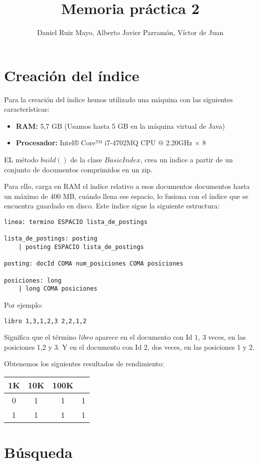 \documentclass[palatino,nochap]{apuntes}
\title{Memoria práctica 2}
\author{Daniel Ruiz Mayo, Alberto Javier Parramón, Víctor de Juan}
\date{}
\begin{document}
\pagestyle{plain}
\maketitle




\section{Creación del índice}

Para la creación del índice hemos utilizado una máquina con las siguientes características:

\begin{itemize}
	\item \textbf{RAM: }5,7 GB (Usamos hasta 5 GB en la máquina virtual de Java)
	\item \textbf{Procesador: } Intel® Core™ i7-4702MQ CPU @ 2.20GHz × 8 
\end{itemize}

EL método $build()$ de la clase $BasicIndex$, crea un índice a partir de un conjunto de documentos comprimidos en un zip.

Para ello, carga en RAM el índice relativo a esos documentos documentos hasta un máximo de 400 MB, cuándo llena ese espacio, lo fusiona con el índice que se encuentra guardado en disco. Este índice sigue la siguiente estructura:

\begin{verbatim}
linea: termino ESPACIO lista_de_postings

lista_de_postings: posting
	| posting ESPACIO lista_de_postings

posting: docId COMA num_posiciones COMA posiciones

posiciones: long
	| long COMA posiciones

\end{verbatim}

Por ejemplo:

\begin{verbatim}
libro 1,3,1,2,3 2,2,1,2
\end{verbatim}

Significa que el término $libro$ aparece en el documento con Id $1$, 3 veces, en las posiciones 1,2 y 3. Y en el documento con Id $2$, dos veces, en las posiciones 1 y 2.

Obtenemos los siguientes resultados de rendimiento:

\begin{tabular}{|c|c|c|c|}
	\hline
	1K & 10K & 100K &  \\
	\hline
	0 & 1 & 1 & 1 \\
	\hline
	1 & 1 & 1 & 1 \\
	\hline
\end{tabular}

\section{Búsqueda}
\end{document}
